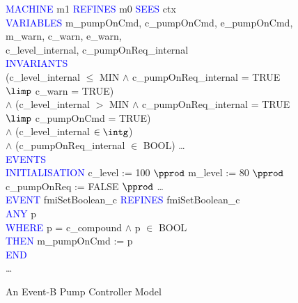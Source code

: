 \begin{figure}
\centering
\begin{minipage}{0.95\textwidth}
\textcolor{blue}{MACHINE} m1 \textcolor{blue}{REFINES} m0 \textcolor{blue}{SEES} ctx \\
\textcolor{blue}{VARIABLES}  \hspace*{0.2cm} m\_pumpOnCmd, c\_pumpOnCmd, e\_pumpOnCmd, m\_warn, c\_warn, e\_warn,\\
\hspace*{0.2cm} c\_level\_internal, c\_pumpOnReq\_internal\\
\textcolor{blue}{INVARIANTS}\\
\hspace*{0.2cm}(c\_level\_internal $\leq$ MIN $\land$  c\_pumpOnReq\_internal = TRUE $\limp$  c\_warn = TRUE)\\
\hspace*{0.2cm} $\land$ (c\_level\_internal $>$  MIN $\land$  c\_pumpOnReq\_internal = TRUE\\
\hspace*{0.5cm} $\limp$  c\_pumpOnCmd = TRUE)\\
\hspace*{0.2cm} $\land$ (c\_level\_internal $\in  \intg$)\\
\hspace*{0.2cm} $\land$ (c\_pumpOnReq\_internal $\in$  BOOL) \ldots\\
\textcolor{blue}{EVENTS}\\
\textcolor{blue}{INITIALISATION} c\_level :=  100 $\pprod$ m\_level := 80 $\pprod$ c\_pumpOnReq :=  FALSE $\pprod$ \ldots\\
\textcolor{blue}{EVENT} fmiSetBoolean\_c \textcolor{blue}{REFINES} fmiSetBoolean\_c\\
\hspace*{0.2cm}\textcolor{blue}{ANY} p\\
\hspace*{0.2cm}\textcolor{blue}{WHERE} p = c\_compound $\land$ p $\in$ BOOL  \\
\hspace*{0.2cm}\textcolor{blue}{THEN} m\_pumpOnCmd :=  p\\
\hspace*{0.2cm}\textcolor{blue}{END}\\
\ldots
\end{minipage}
\caption{An Event-B  Pump Controller Model}
\label{fig:controllerSpec2}
\end{figure}
